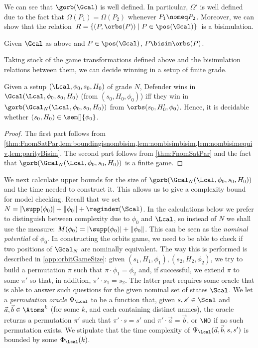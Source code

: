 We can see that $\gorb(\Gcal)$ is well defined. In particular, $\Omega'$ is well defined due to the fact that $\Omega(P_1)=\Omega(P_2)$ whenever $P_1\nomeq P_2$.  
Moreover, we can show that the relation\ $R
=        \{(P, \orbs(P)) \mid P \in \pos(\Gcal)\}$\ is a bisimulation.


\begin{lemma}\label{lem:parityBisim}
  Given $\Gcal$ as above and $P\in\pos(\Gcal)$, $P\bisim\orbs(P)$.
\end{lemma}

Taking stock of the game transformations defined above and the bisimulation relations between them, we can decide winning in a setup of finite grade.

\begin{corollary}\label{cor:winningNom}
Given a setup $(\Lcal,\phi_0,s_0,H_0)$ of grade $N$, Defender wins in $\Gcal(\Lcal,\phi_0,s_0,H_0)$ (from $(s_0,H_0,\phi_0)$) iff they win in $\gorb(\Gcal_N(\Lcal,\phi_0,s_0,H_0))$ from $\orbs(s_0,H_0',\phi_0)$. Hence, it is decidable whether $(s_0,H_0)\in\sem[]{\phi_0}$.
\end{corollary}
\begin{proof}
The first part follows from \cref{thm:FnomSatPar,lem:boundingisnombisim,lem:nombisimbisim,lem:nombisimequiv,lem:parityBisim}. The second part follows from \cref{thm:FnomSatPar} and the fact that 
$\gorb(\Gcal_N(\Lcal,\phi_0,s_0,H_0))$ is a finite game.
\end{proof}

We next calculate upper bounds for the size of $\gorb(\Gcal_N(\Lcal,\phi_0,s_0,H_0))$ and the time needed to construct it. This allows us to give a complexity bound for model checking.
Recall that we set $N=|\supp(\phi_0)|+\|\phi_0\|+\regindex(\Scal)$. In the calculations below we prefer to distinguish between complexity due to $\phi_0$ and $\Lcal$, so instead of $N$ we shall use the measure: $M(\phi_0)=|\supp(\phi_0)|+\|\phi_0\|$. This can be seen as the \emph{nominal potential} of $\phi_0$.
In constructing the orbits game, we need to be able to check if two positions of $\Gcal_N$ are nominally equivalent. The way this is performed is described in \cref{app:orbitGameSize}: given $(s_1,H_1,\phi_1),(s_2,H_2,\phi_2)$, we try to build a permutation $\pi$ such that $\pi\cdot\phi_1=\phi_2$ and, if successful, we extend $\pi$ to some $\pi'$ so that, in addition, $\pi'\cdot s_1=s_2$. The latter part requires some oracle that is able to answer such questions for the given nominal set of states $\Scal$.
We let a \emph{permutation oracle} $\Psi_\Lcal$ to be a function that,
given  $s, s' \in \Scal$
	 and  $\vec a, \vec b \in \Atoms^k$ (for some $k$, and each containing distinct names), the oracle returns 
	a permutation $\pi'$ such that $\pi' \cdot s =s'$ and $\pi'\cdot \vec a = \vec b$,
	or $\NO$ if no such permutation exists. 
	We stipulate that the time complexity of $\Psi_\Lcal(\vec a, \vec b, s, s')$ is bounded by some $\Phi_\Lcal(k)$.



